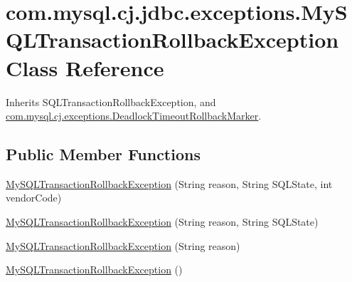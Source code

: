 \hypertarget{classcom_1_1mysql_1_1cj_1_1jdbc_1_1exceptions_1_1_my_s_q_l_transaction_rollback_exception}{}\section{com.\+mysql.\+cj.\+jdbc.\+exceptions.\+My\+S\+Q\+L\+Transaction\+Rollback\+Exception Class Reference}
\label{classcom_1_1mysql_1_1cj_1_1jdbc_1_1exceptions_1_1_my_s_q_l_transaction_rollback_exception}


Inherits S\+Q\+L\+Transaction\+Rollback\+Exception, and \mbox{\hyperlink{interfacecom_1_1mysql_1_1cj_1_1exceptions_1_1_deadlock_timeout_rollback_marker}{com.\+mysql.\+cj.\+exceptions.\+Deadlock\+Timeout\+Rollback\+Marker}}.

\subsection*{Public Member Functions}
\begin{DoxyCompactItemize}
\item 
\mbox{\hyperlink{classcom_1_1mysql_1_1cj_1_1jdbc_1_1exceptions_1_1_my_s_q_l_transaction_rollback_exception_ac4874443ba9b32a6798978bbff83adf1}{My\+S\+Q\+L\+Transaction\+Rollback\+Exception}} (String reason, String S\+Q\+L\+State, int vendor\+Code)
\item 
\mbox{\hyperlink{classcom_1_1mysql_1_1cj_1_1jdbc_1_1exceptions_1_1_my_s_q_l_transaction_rollback_exception_ab52de149ce388c6088e916cead845580}{My\+S\+Q\+L\+Transaction\+Rollback\+Exception}} (String reason, String S\+Q\+L\+State)
\item 
\mbox{\hyperlink{classcom_1_1mysql_1_1cj_1_1jdbc_1_1exceptions_1_1_my_s_q_l_transaction_rollback_exception_a8e68bb1ea2bb2b8b4c7c7aad040ba847}{My\+S\+Q\+L\+Transaction\+Rollback\+Exception}} (String reason)
\item 
\mbox{\hyperlink{classcom_1_1mysql_1_1cj_1_1jdbc_1_1exceptions_1_1_my_s_q_l_transaction_rollback_exception_a84a77fef8e325dbf296739989542719a}{My\+S\+Q\+L\+Transaction\+Rollback\+Exception}} ()
\end{DoxyCompactItemize}


